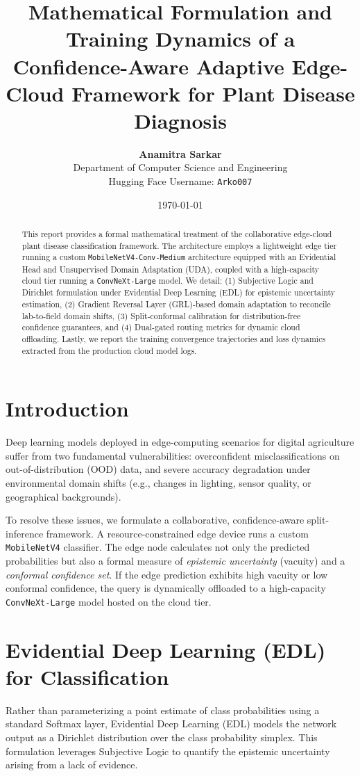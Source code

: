 \documentclass[11pt,journal,onecolumn]{IEEEtran}
\title{\textbf{Mathematical Formulation and Training Dynamics of a Confidence-Aware Adaptive Edge-Cloud Framework for Plant Disease Diagnosis}}
\author{\textbf{Anamitra Sarkar} \\ \small Department of Computer Science and Engineering \\ \small Hugging Face Username: \texttt{Arko007}}
\date{\today}
\begin{document}
\maketitle

\begin{abstract}
This report provides a formal mathematical treatment of the collaborative edge-cloud plant disease classification framework. The architecture employs a lightweight edge tier running a custom \texttt{MobileNetV4-Conv-Medium} architecture equipped with an Evidential Head and Unsupervised Domain Adaptation (UDA), coupled with a high-capacity cloud tier running a \texttt{ConvNeXt-Large} model. We detail: (1) Subjective Logic and Dirichlet formulation under Evidential Deep Learning (EDL) for epistemic uncertainty estimation, (2) Gradient Reversal Layer (GRL)-based domain adaptation to reconcile lab-to-field domain shifts, (3) Split-conformal calibration for distribution-free confidence guarantees, and (4) Dual-gated routing metrics for dynamic cloud offloading. Lastly, we report the training convergence trajectories and loss dynamics extracted from the production cloud model logs.
\end{abstract}

\section{Introduction}
Deep learning models deployed in edge-computing scenarios for digital agriculture suffer from two fundamental vulnerabilities: overconfident misclassifications on out-of-distribution (OOD) data, and severe accuracy degradation under environmental domain shifts (e.g., changes in lighting, sensor quality, or geographical backgrounds). 

To resolve these issues, we formulate a collaborative, confidence-aware split-inference framework. A resource-constrained edge device runs a custom \texttt{MobileNetV4} classifier. The edge node calculates not only the predicted probabilities but also a formal measure of \textit{epistemic uncertainty} (vacuity) and a \textit{conformal confidence set}. If the edge prediction exhibits high vacuity or low conformal confidence, the query is dynamically offloaded to a high-capacity \texttt{ConvNeXt-Large} model hosted on the cloud tier. 

\section{Evidential Deep Learning (EDL) for Classification}
Rather than parameterizing a point estimate of class probabilities using a standard Softmax layer, Evidential Deep Learning (EDL) models the network output as a Dirichlet distribution over the class probability simplex. This formulation leverages Subjective Logic to quantify the epistemic uncertainty arising from a lack of evidence.
\end{document}
